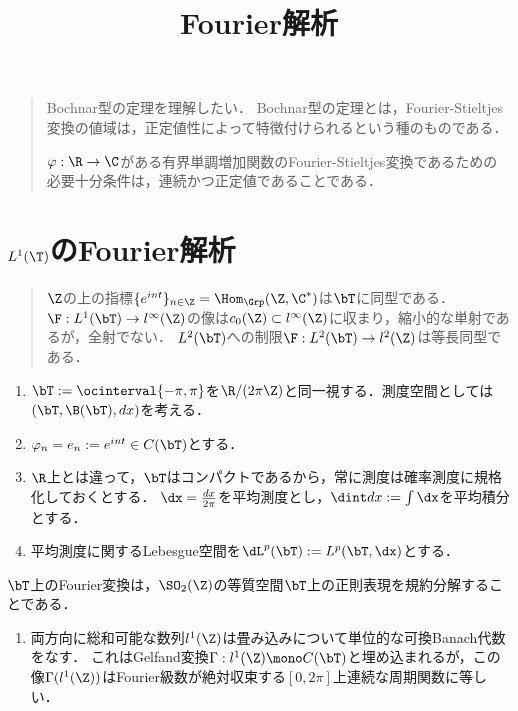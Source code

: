 \documentclass[uplatex,dvipdfmx]{jsreport}
\title{Fourier解析}
\author{}
\begin{document}
\tableofcontents

\begin{quotation}
    Bochnar型の定理を理解したい．
    Bochnar型の定理とは，Fourier-Stieltjes変換の値域は，正定値性によって特徴付けられるという種のものである．
    \begin{theorem}
        $\varphi:\R\to\C$がある有界単調増加関数のFourier-Stieltjes変換であるための必要十分条件は，連続かつ正定値であることである．
    \end{theorem}
\end{quotation}

\chapter{$L^1(\T)$のFourier解析}

\begin{quotation}
    $\Z$の上の指標$\{e^{int}\}_{n\in\Z}=\Hom_\Grp(\Z,\C^*)$は$\bT$に同型である．
    $\F:L^1(\bT)\to l^\infty(\Z)$の像は$c_0(\Z)\subset l^\infty(\Z)$に収まり，縮小的な単射であるが，全射でない．
    $L^2(\bT)$への制限$\F:L^2(\bT)\to l^2(\Z)$は等長同型である．
\end{quotation}

\begin{notation}\mbox{}
    \begin{enumerate}
        \item $\bT:=\ocinterval{-\pi,\pi}$を$\R/(2\pi\Z)$と同一視する．測度空間としては$(\bT,\B(\bT),dx)$を考える．
        \item $\varphi_n=e_n:=e^{int}\in C(\bT)$とする．
        \item $\R$上とは違って，$\bT$はコンパクトであるから，常に測度は確率測度に規格化しておくとする．
        $\dx=\frac{dx}{2\pi}$を平均測度とし，$\dint dx:=\int\dx$を平均積分とする．
        \item 平均測度に関するLebesgue空間を$\dL^p(\bT):= L^p(\bT,\dx)$とする．
    \end{enumerate}
\end{notation}
\begin{remarks}[Fourier変換の逆としてのGelfand変換]
    $\bT$上のFourier変換は，$\SO_2(\Z)$の等質空間$\bT$上の正則表現を規約分解することである．
    \begin{enumerate}
        \item 両方向に総和可能な数列$l^1(\Z)$は畳み込みについて単位的な可換Banach代数をなす．
        これはGelfand変換$\Gamma:l^1(\Z)\mono C(\bT)$と埋め込まれるが，この像$\Gamma(l^1(\Z))$はFourier級数が絶対収束する$[0,2\pi]$上連続な周期関数に等しい．
    \end{enumerate}
\end{remarks}
\end{document}

